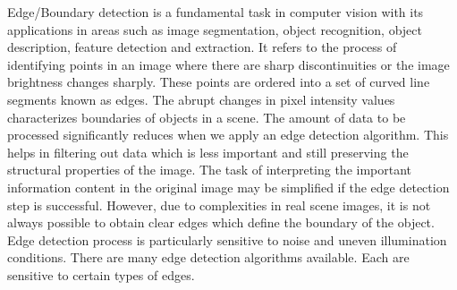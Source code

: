 Edge/Boundary detection is a fundamental task in computer vision with its applications 
in areas such as image segmentation, object recognition, object description, feature detection and extraction. 
It refers to the process of identifying points in an image where there are sharp discontinuities or
the image brightness changes sharply.
These points are ordered into a set of curved line segments known as edges.
The abrupt changes in pixel intensity values characterizes boundaries of objects in a scene.
The amount of data to be processed significantly reduces when we apply an edge detection algorithm.
This helps in filtering out data which is less important and still preserving the structural
properties of the image.
The task of interpreting the important information content in the original 
image may be simplified if the edge detection step is successful. However,
due to complexities in real scene images, it is not always possible to obtain 
clear edges which define the boundary of the object. Edge detection process is particularly sensitive to
noise and uneven illumination conditions. There are many edge detection algorithms available.
Each are sensitive to certain types of edges.
